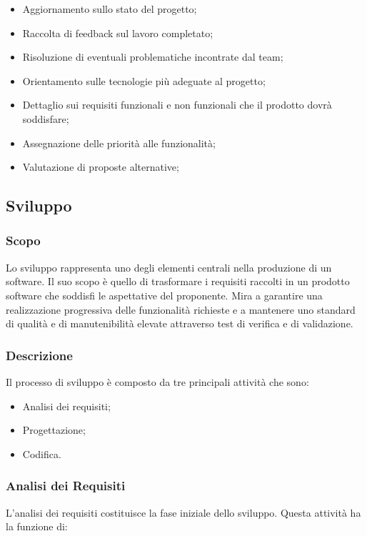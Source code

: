         \begin{itemize}
            \item Aggiornamento sullo stato del progetto;
            \item Raccolta di feedback sul lavoro completato;
            \item Risoluzione di eventuali problematiche incontrate dal team;
            \item Orientamento sulle tecnologie più adeguate al progetto;
            \item Dettaglio sui requisiti funzionali e non funzionali che il prodotto dovrà soddisfare;
            \item Assegnazione delle priorità alle funzionalità;
            \item Valutazione di proposte alternative;
        \end{itemize}

    \subsection{Sviluppo}
        \subsubsection{Scopo}
        Lo sviluppo rappresenta uno degli elementi centrali nella produzione di un software.
        Il suo scopo è quello di trasformare i requisiti raccolti in un 
        prodotto software che soddisfi le aspettative del 
        proponente. Mira a garantire una realizzazione progressiva delle 
        funzionalità richieste e a mantenere uno standard di qualità e di
        manutenibilità elevate attraverso test di verifica e di validazione.

        \subsubsection{Descrizione}
        Il processo di sviluppo è composto da tre principali attività che sono:
        \begin{itemize}
            \item Analisi dei requisiti;
            \item Progettazione;
            \item Codifica.
        \end{itemize}


        \subsubsection{Analisi dei Requisiti}
        L'analisi dei requisiti costituisce la fase iniziale dello sviluppo.
        Questa attività ha la funzione di: 

